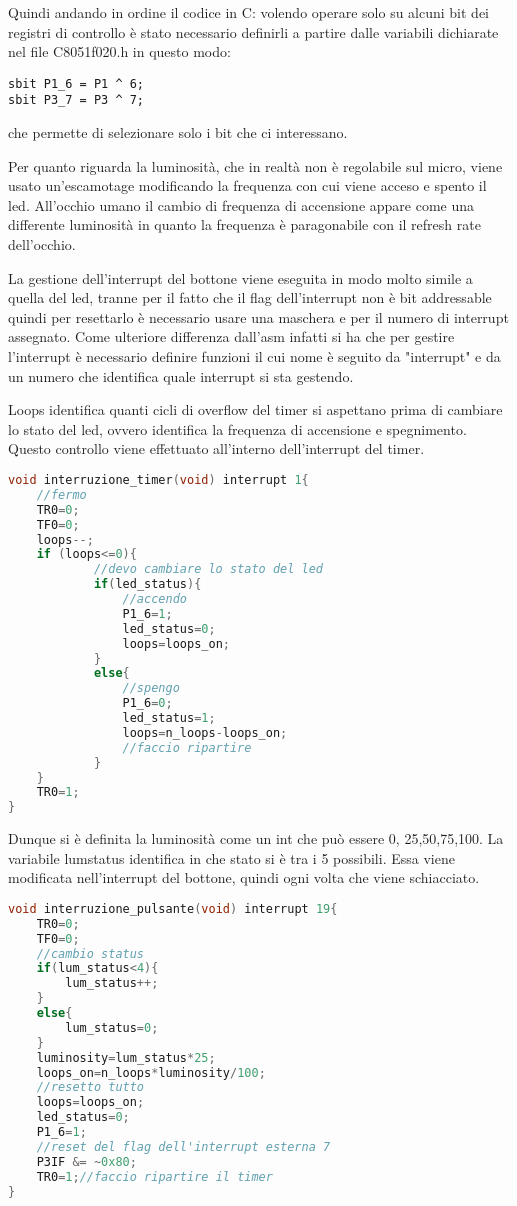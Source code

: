 \documentclass[main.tex]{subfiles}
\begin{document}
Quindi andando in ordine il codice in C: volendo operare solo su alcuni bit dei registri di controllo è stato necessario definirli a partire dalle variabili dichiarate nel file C8051f020.h in questo modo:
\begin{lstlisting}
sbit P1_6 = P1 ^ 6;
sbit P3_7 = P3 ^ 7;
\end{lstlisting}
che permette di selezionare solo i bit che ci interessano. 

Per quanto riguarda la luminosità, che in realtà non è regolabile sul micro, viene usato un'escamotage modificando la frequenza con cui viene acceso e spento il led. All'occhio umano il cambio di frequenza di accensione appare come una differente luminosità in quanto la frequenza è paragonabile con il refresh rate dell'occhio. 

La gestione dell'interrupt del bottone viene eseguita in modo molto simile a quella del led, tranne per il fatto che il flag dell'interrupt non è bit addressable quindi per resettarlo è necessario usare una maschera e per il numero di interrupt assegnato. 
Come ulteriore differenza dall'asm infatti si ha che per gestire l'interrupt è necessario definire funzioni il cui nome è seguito da "interrupt" e da un numero che identifica quale interrupt si sta gestendo. 

 Loops identifica quanti cicli di overflow del timer si aspettano prima di cambiare lo stato del led, ovvero identifica la frequenza di accensione e spegnimento. Questo controllo viene effettuato all'interno dell'interrupt del timer.
 \begin{lstlisting}[language=C,caption=Interrupt timer]
 void interruzione_timer(void) interrupt 1{
	//fermo
	TR0=0;
	TF0=0;
	loops--;
	if (loops<=0){
	        //devo cambiare lo stato del led
			if(led_status){
				//accendo
				P1_6=1;
				led_status=0;
				loops=loops_on;
			}
			else{
				//spengo
				P1_6=0;
				led_status=1;
				loops=n_loops-loops_on;
				//faccio ripartire
			}
	}
	TR0=1;
}
 \end{lstlisting}
 
 Dunque si è definita la luminosità come un int che può essere 0, 25,50,75,100. La variabile lumstatus identifica in che stato si è tra i 5 possibili. Essa viene modificata nell'interrupt del bottone, quindi ogni volta che viene schiacciato.
 \begin{lstlisting}[language=C, caption=Interrupt pulsante,label={lst:led in C}]
 void interruzione_pulsante(void) interrupt 19{
	TR0=0;
	TF0=0;
	//cambio status
	if(lum_status<4){
		lum_status++;
	}
	else{
		lum_status=0;
	}
	luminosity=lum_status*25;
	loops_on=n_loops*luminosity/100;
	//resetto tutto
	loops=loops_on;
	led_status=0;
	P1_6=1;
	//reset del flag dell'interrupt esterna 7
	P3IF &= ~0x80;
	TR0=1;//faccio ripartire il timer
}
 \end{lstlisting}
\end{document}
